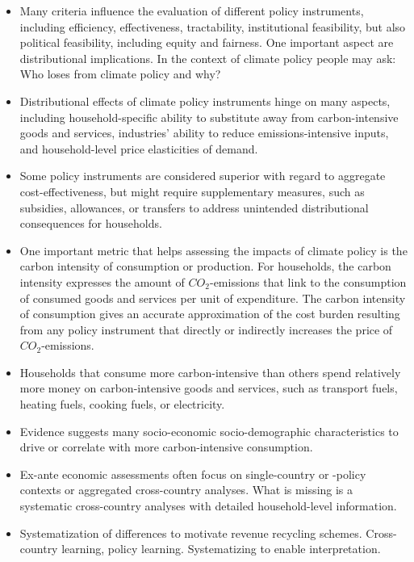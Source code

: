 \documentclass[12pt, a4paper]{article}
\begin{document}
\begin{itemize}
  \item Many criteria influence the evaluation of different policy instruments, including efficiency, effectiveness, tractability, institutional feasibility, but also political feasibility, including equity and fairness. One important aspect are distributional implications. In the context of climate policy people may ask: Who loses from climate policy and why?
  \item Distributional effects of climate policy instruments hinge on many aspects, including household-specific ability to substitute away from carbon-intensive goods and services, industries' ability to reduce emissions-intensive inputs, and household-level price elasticities of demand.
  \item Some policy instruments are considered superior with regard to aggregate cost-effectiveness, but might require supplementary measures, such as subsidies, allowances, or transfers to address unintended distributional consequences for households.
  \item One important metric that helps assessing the impacts of climate policy is the carbon intensity of consumption or production. For households, the carbon intensity expresses the amount of $CO_{2}$-emissions that link to the consumption of consumed goods and services per unit of expenditure. The carbon intensity of consumption gives an accurate approximation of the cost burden resulting from any policy instrument that directly or indirectly increases the price of $CO_{2}$-emissions.
  \item Households that consume more carbon-intensive than others spend relatively more money on carbon-intensive goods and services, such as transport fuels, heating fuels, cooking fuels, or electricity.
  \item Evidence suggests many socio-economic socio-demographic characteristics to drive or correlate with more carbon-intensive consumption.
  \item Ex-ante economic assessments often focus on single-country or -policy contexts or aggregated cross-country analyses. What is missing is a systematic cross-country analyses with detailed household-level information.
  \item Systematization of differences to motivate revenue recycling schemes. Cross-country learning, policy learning. Systematizing to enable interpretation.
\end{itemize}
\end{document}
